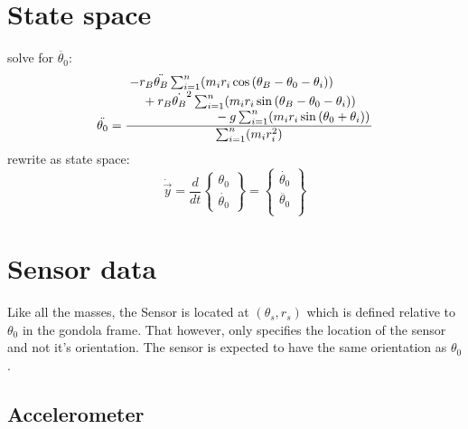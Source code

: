 \documentclass[titlepage]{article}
\numberwithin{equation}{section}
\begin{document}
\pagebreak
\section{State space}
solve for $\ddot{\theta_0}$:
\begin{equation}
\ddot{\theta_0} =
    \frac{
        \splitfrac{
            \splitfrac{
                - r_B \ddot{\theta_B} \sum_{i=1}^{n}(m_i r_i \cos{(\theta_B - \theta_0 - \theta_i)})
            } {
                + r_B \dot{\theta_B}^2 \sum_{i=1}^{n}(m_i r_i \sin{(\theta_B - \theta_0 - \theta_i)})
            }
        } {
            - g \sum_{i=1}^{n}(m_i r_i \sin{(\theta_0 + \theta_i)})
        }
    } {
        \sum_{i=1}^{n}(m_i r_i^2)
    } \label{eq:thetadd}
\end{equation}
rewrite as state space:
\begin{equation}
\dot{\overrightarrow{y}} = \frac{d}{dt}
\left\{\!
\begin{array}{c}
  \theta_0 \\
  \dot{\theta_0}
\end{array}
\!\right\} = 
\left\{\!
\begin{array}{c}
  \dot{\theta_0} \\
  \ddot{\theta_0} \\
\end{array}
\!\right\}
\end{equation}

\section{Sensor data}
Like all the masses, the Sensor is located at $(\theta_s, r_s)$ which is defined relative to $\theta_0$ in the gondola frame.
That however, only specifies the location of the sensor and not it's orientation.
The sensor is expected to have the same orientation as $\theta_0$.

\subsection{Accelerometer}
\end{document}
